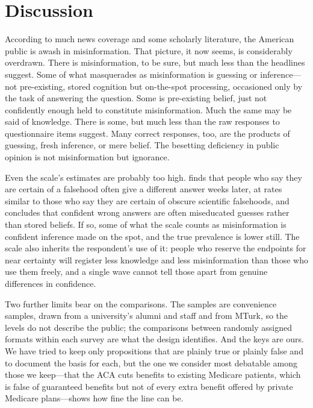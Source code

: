 \documentclass[11pt]{article}
\begin{document}
\section{Discussion}

According to much news coverage and some scholarly literature, the American public is awash in misinformation. That picture, it now seems, is considerably overdrawn. There is misinformation, to be sure, but much less than the headlines suggest. Some of what masquerades as misinformation is guessing or inference---not pre-existing, stored cognition but on-the-spot processing, occasioned only by the task of answering the question. Some is pre-existing belief, just not confidently enough held to constitute misinformation. Much the same may be said of knowledge. There is some, but much less than the raw responses to questionnaire items suggest. Many correct responses, too, are the products of guessing, fresh inference, or mere belief. The besetting deficiency in public opinion is not misinformation but ignorance.

Even the scale's estimates are probably too high. \citet{graham2023} finds that people who say they are certain of a falsehood often give a different answer weeks later, at rates similar to those who say they are certain of obscure scientific falsehoods, and concludes that confident wrong answers are often miseducated guesses rather than stored beliefs. If so, some of what the scale counts as misinformation is confident inference made on the spot, and the true prevalence is lower still. The scale also inherits the respondent's use of it: people who reserve the endpoints for near certainty will register less knowledge and less misinformation than those who use them freely, and a single wave cannot tell those apart from genuine differences in confidence.

Two further limits bear on the comparisons. The samples are convenience samples, drawn from a university's alumni and staff and from MTurk, so the levels do not describe the public; the comparisons between randomly assigned formats within each survey are what the design identifies. And the keys are ours. We have tried to keep only propositions that are plainly true or plainly false and to document the basis for each, but the one we consider most debatable among those we keep---that the ACA cuts benefits to existing Medicare patients, which is false of guaranteed benefits but not of every extra benefit offered by private Medicare plans---shows how fine the line can be.
\end{document}
